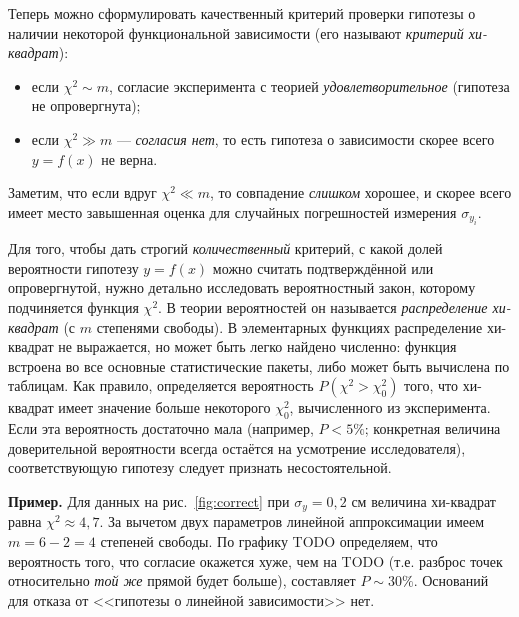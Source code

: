 \documentclass[10pt]{article}
\begin{document}
{\small{}Теперь можно сформулировать качественный критерий проверки
гипотезы о наличии некоторой функциональной зависимости (его называют
}\emph{\small{}критерий хи-квадрат}{\small{}): }{\small\par}
\begin{itemize}
\item {\small{}если $\chi^{2}\sim m$, согласие эксперимента с теорией }\emph{\small{}удовлетворительное}{\small{}
(гипотеза не опровергнута); }{\small\par}
\item {\small{}если $\chi^{2}\gg m$ --- }\emph{\small{}согласия
нет}{\small{}, то есть гипотеза о зависимости скорее всего $y=f\!\left(x\right)$
не верна.}{\small\par}
\end{itemize}
{\small{}Заметим, что если вдруг $\chi^{2}\ll m$, то совпадение }\emph{\small{}слишком}{\small{}
хорошее, и скорее всего имеет место завышенная оценка для случайных
погрешностей измерения $\sigma_{y_{i}}$.}{\small\par}

{\small{}Для того, чтобы дать строгий }\emph{\small{}количественный}{\small{}
критерий, с какой долей вероятности гипотезу $y=f\!\left(x\right)$
можно считать подтверждённой или опровергнутой, нужно детально исследовать
вероятностный закон, которому подчиняется функция $\chi^{2}$. В теории
вероятностей он называется }\emph{\small{}распределение хи-квадрат}{\small{}
(с $m$ степенями свободы). В элементарных функциях распределение
хи-квадрат не выражается, но может быть легко найдено численно: функция
встроена во все основные статистические пакеты, либо может быть вычислена
по таблицам. Как правило, определяется вероятность $P\left(\chi^{2}>\chi_{0}^{2}\right)$
того, что хи-квадрат имеет значение больше некоторого $\chi_{0}^{2}$,
вычисленного из эксперимента. Если эта вероятность достаточно мала
(например, $P<5\%$; конкретная величина доверительной вероятности
всегда остаётся на усмотрение исследователя), соответствующую гипотезу
следует признать несостоятельной.}{\small\par}

\textbf{\footnotesize{}Пример.}{\footnotesize{} Для данных на рис.~\ref{fig:correct}
при $\sigma_{y}=0{,}2$ см величина хи-квадрат равна $\chi^{2}\approx4{,}7$.
За вычетом двух параметров линейной аппроксимации имеем $m=6-2=4$
степеней свободы. По графику TODO определяем, что вероятность того,
что согласие окажется хуже, чем на TODO (т.е. разброс точек относительно
}\emph{\footnotesize{}той же}{\footnotesize{} прямой будет больше),
составляет $P\sim30\%$. Оснований для отказа от <<гипотезы
о линейной зависимости>> нет.}{\footnotesize\par}
\end{document}

